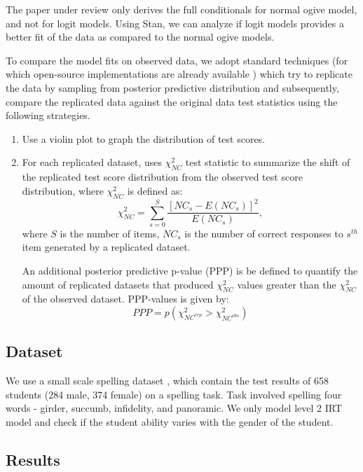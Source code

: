 \documentclass[12pt]{article}
\begin{document}
The paper under review \cite{fox2001bayesian} only derives the full conditionals for normal ogive model, and not for logit models. Using Stan, we can analyze if logit models provides a better fit of the data as compared to the normal ogive models.

To compare the model fits on observed data, we adopt standard techniques (for which open-source implementations are already available \cite{furr2016two}) which try to replicate the data by sampling from posterior predictive distribution and subsequently, compare the replicated data against the original data test statistics using the following strategies.
\begin{enumerate}
    \item Use a violin plot to graph the distribution of test scores.
    \item For each replicated dataset, \cite{furr2016two} uses $\chi^2_{NC}$ test statistic \cite{beguin2001mcmc} to summarize the shift of the replicated test score distribution from the observed test score distribution, where $\chi^2_{NC}$ is defined as:
    \begin{equation*}
        \chi^2_{NC} = \sum_{s=0}^S \frac{[NC_s - E(NC_s)]^2}{E(NC_s)},
    \end{equation*} where
    $S$ is the number of items, $NC_s$ is the number of correct responses to $s^{th}$ item generated by a replicated dataset.
    
    An additional posterior predictive p-value (PPP) is be defined to quantify the amount of replicated datasets that produced $\chi^2_{NC}$ values greater than the $\chi^2_{NC}$ of the observed dataset. PPP-values is given by:
    \begin{equation*}
        PPP = p(\chi^2_{NC^{rep}} > \chi^2_{NC^{obs}})
    \end{equation*}
\end{enumerate}

\subsection{Dataset}

We use a small scale spelling dataset \cite{thissen1993detection}, which contain the test results of 658 students (284 male, 374 female) on a spelling task. Task involved spelling four words - girder, succumb, infidelity, and panoramic. We only model level 2 IRT model and check if the student ability varies with the gender of the student.

\subsection{Results}
\end{document}
